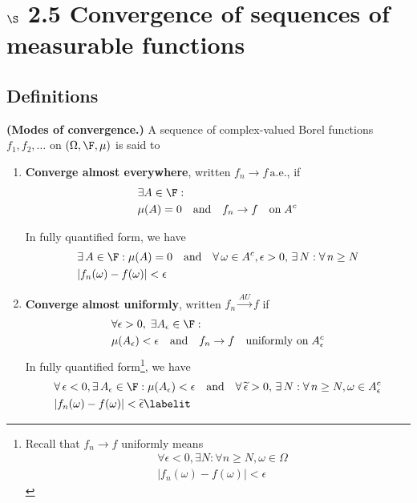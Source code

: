 \documentclass{article} %
\begin{document}
\section{$\S$ 2.5 Convergence of sequences of measurable functions}

\subsection{Definitions}

\begin{definition}{\textbf{(Modes of convergence.)}}
A sequence of complex-valued Borel functions $f_1, f_2, \hdots$ on $(\Omega, \F, \mu)$ is said to
\begin{enumerate}
\item \textbf{Converge almost everywhere}, written $f_n \to f \, \text{a.e.}$, if
\begin{align*} 
& \exists A \in \F : \\
& \mu(A) =0 \quad \text{and} \quad f_n \to f \quad \text{on} \; A^c 	
\end{align*}

In fully quantified form, we have 
\begin{align*}
 &\exists \, A \in \F : \mu(A) =0  \quad \text{and} \quad \forall \, \omega \in A^c, \epsilon >0, \, \exists \, N : \forall \, n \geq N \\
 & |f_n(\omega) - f(\omega)| < \epsilon 	
\end{align*}
\item \textbf{Converge almost uniformly}, written $f_n \stackrel{AU}{\to} f$ if 
\begin{align*} 
& \forall \epsilon >0, \; \exists A_\epsilon \in \F : \\
& \mu(A_\epsilon) < \epsilon \quad \text{and} \quad f_n \to f \quad \text{uniformly on} \; A_\epsilon^c 	
\end{align*} 
In fully quantified form\footnote{Recall that $f_n \to f$ uniformly means 
\begin{align*}
&\forall \epsilon <0, \exists N : \forall n \geq N, \omega \in \Omega \\
& |f_n(\omega) - f(\omega) | < \epsilon 	
\end{align*}
}, we have 
\begin{align*}
&\forall \, \epsilon <0, \exists \, A_\epsilon \in \F : \mu(A_\epsilon) < \epsilon \quad \text{and} \quad \forall \, \epsilontilde >0, \, \exists \, N : \forall \, n \geq N, \omega \in A_\epsilon^c \\
& |f_n(\omega) - f(\omega) | < \epsilontilde 
\labelit \label{eqn:def_of_convergence_almost_uniformly_in_quantified_form}	
\end{align*}
 


\end{enumerate}
\end{definition}
\end{document}
